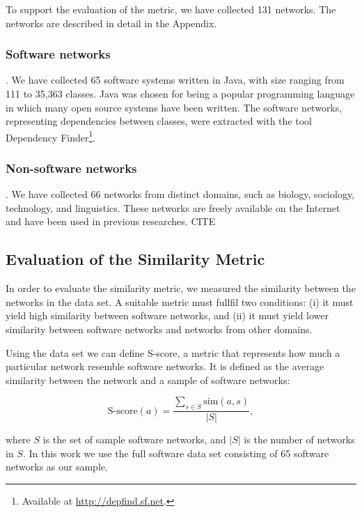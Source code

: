 To support the evaluation of the metric, we have collected 131 networks. The
networks are described in detail in the Appendix.

\subsubsection{Software networks}. We have collected 65 software systems written in
Java, with size ranging from 111 to 35,363 classes. Java was chosen for being a
popular programming language in which many open source systems have been
written. The software networks, representing dependencies between classes, were
extracted with the tool Dependency Finder\footnote{Available at
\url{http://depfind.sf.net}.}.

\subsubsection{Non-software networks}. We have collected 66 networks from distinct
domains, such as biology, sociology, technology, and linguistics. These networks
are freely available on the Internet and have been used in previous researches.
CITE


\subsection{Evaluation of the Similarity Metric}

In order to evaluate the similarity metric, we measured the similarity between
the networks in the data set. A suitable metric must fullfil two conditions: (i)
it must yield high similarity between software networks, and (ii) it must yield
lower similarity between software networks and networks from other domains.

Using the data set we can define S-score, a metric that represents how much a
particular network resemble software networks. It is defined as the average
similarity between the network and a sample of software networks:

$$
\mathrm{S\mbox{-}score}(a) = \frac{
\displaystyle\sum_{s \in S} \mathrm{sim}(a, s)
}{|S|} \mathrm{,}
$$

where $S$ is the set of sample software networks, and $|S|$ is the number of
networks in $S$. In this work we use the full software data set consisting of 65
software networks as our sample.

